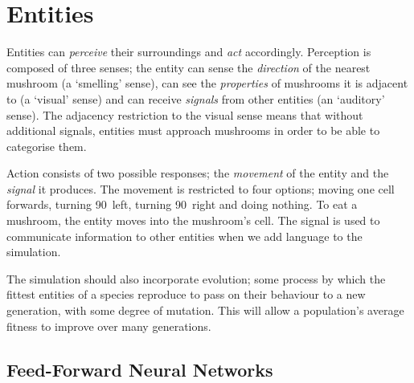 \documentclass[12pt,a4paper]{report}
\begin{document}

\section{Entities}\label{section:entities}

Entities can \emph{perceive} their surroundings and \emph{act} accordingly. Perception is composed of three senses; the entity can sense the \emph{direction} of the nearest mushroom (a `smelling' sense), can see the \emph{properties} of mushrooms it is adjacent to (a `visual' sense) and can receive \emph{signals} from other entities (an `auditory' sense). The adjacency restriction to the visual sense means that without additional signals, entities must approach mushrooms in order to be able to categorise them.

Action consists of two possible responses; the \emph{movement} of the entity and the \emph{signal} it produces. The movement is restricted to four options; moving one cell forwards, turning 90\textdegree~left, turning 90\textdegree~right and doing nothing. To eat a mushroom, the entity moves into the mushroom's cell. The signal is used to communicate information to other entities when we add language to the simulation.

The simulation should also incorporate evolution; some process by which the fittest entities of a species reproduce to pass on their behaviour to a new generation, with some degree of mutation. This will allow a population's average fitness to improve over many generations.

\subsection{Feed-Forward Neural Networks}\label{section:neural}
\end{document}
